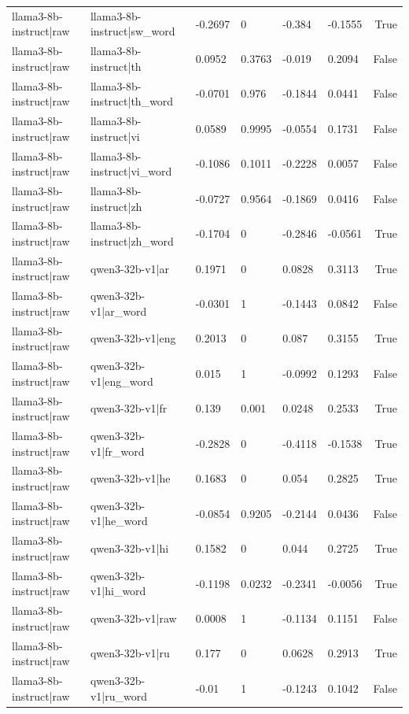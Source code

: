 \begin{table}
\begin{tabular}{llllllr}
llama3-8b-instruct|raw & llama3-8b-instruct|sw_word & -0.2697 & 0 & -0.384 & -0.1555 & True \\
llama3-8b-instruct|raw & llama3-8b-instruct|th & 0.0952 & 0.3763 & -0.019 & 0.2094 & False \\
llama3-8b-instruct|raw & llama3-8b-instruct|th_word & -0.0701 & 0.976 & -0.1844 & 0.0441 & False \\
llama3-8b-instruct|raw & llama3-8b-instruct|vi & 0.0589 & 0.9995 & -0.0554 & 0.1731 & False \\
llama3-8b-instruct|raw & llama3-8b-instruct|vi_word & -0.1086 & 0.1011 & -0.2228 & 0.0057 & False \\
llama3-8b-instruct|raw & llama3-8b-instruct|zh & -0.0727 & 0.9564 & -0.1869 & 0.0416 & False \\
llama3-8b-instruct|raw & llama3-8b-instruct|zh_word & -0.1704 & 0 & -0.2846 & -0.0561 & True \\
llama3-8b-instruct|raw & qwen3-32b-v1|ar & 0.1971 & 0 & 0.0828 & 0.3113 & True \\
llama3-8b-instruct|raw & qwen3-32b-v1|ar_word & -0.0301 & 1 & -0.1443 & 0.0842 & False \\
llama3-8b-instruct|raw & qwen3-32b-v1|eng & 0.2013 & 0 & 0.087 & 0.3155 & True \\
llama3-8b-instruct|raw & qwen3-32b-v1|eng_word & 0.015 & 1 & -0.0992 & 0.1293 & False \\
llama3-8b-instruct|raw & qwen3-32b-v1|fr & 0.139 & 0.001 & 0.0248 & 0.2533 & True \\
llama3-8b-instruct|raw & qwen3-32b-v1|fr_word & -0.2828 & 0 & -0.4118 & -0.1538 & True \\
llama3-8b-instruct|raw & qwen3-32b-v1|he & 0.1683 & 0 & 0.054 & 0.2825 & True \\
llama3-8b-instruct|raw & qwen3-32b-v1|he_word & -0.0854 & 0.9205 & -0.2144 & 0.0436 & False \\
llama3-8b-instruct|raw & qwen3-32b-v1|hi & 0.1582 & 0 & 0.044 & 0.2725 & True \\
llama3-8b-instruct|raw & qwen3-32b-v1|hi_word & -0.1198 & 0.0232 & -0.2341 & -0.0056 & True \\
llama3-8b-instruct|raw & qwen3-32b-v1|raw & 0.0008 & 1 & -0.1134 & 0.1151 & False \\
llama3-8b-instruct|raw & qwen3-32b-v1|ru & 0.177 & 0 & 0.0628 & 0.2913 & True \\
llama3-8b-instruct|raw & qwen3-32b-v1|ru_word & -0.01 & 1 & -0.1243 & 0.1042 & False \\

\end{tabular}
\end{table}
